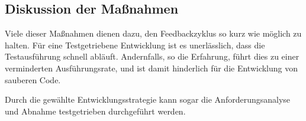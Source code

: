 \subsection{Diskussion der Maßnahmen}

Viele dieser Maßnahmen dienen dazu, den Feedbackzyklus so kurz wie möglich zu halten. Für eine Testgetriebene Entwicklung ist es unerlässlich, dass die Testausführung schnell abläuft. Andernfalls, so die Erfahrung, führt dies zu einer verminderten Ausführungsrate, und ist damit hinderlich für die Entwicklung von sauberen Code.

Durch die gewählte Entwicklungsstrategie kann sogar die Anforderungsanalyse und Abnahme testgetrieben durchgeführt werden.

